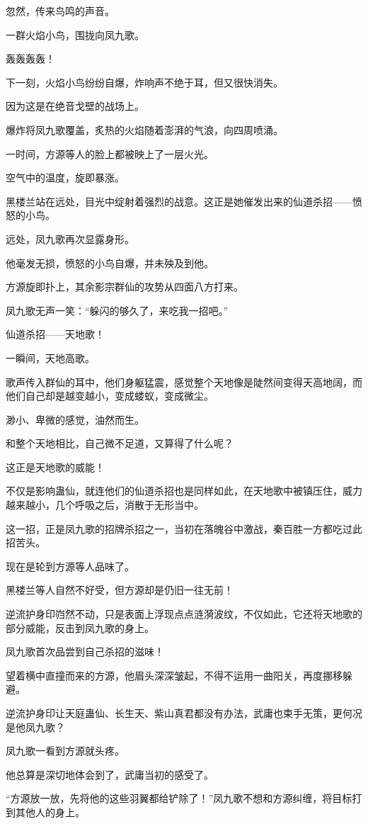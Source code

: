 \begin{this_body}
忽然，传来鸟鸣的声音。

一群火焰小鸟，围拢向凤九歌。

轰轰轰轰！

下一刻，火焰小鸟纷纷自爆，炸响声不绝于耳，但又很快消失。

因为这是在绝音戈壁的战场上。

爆炸将凤九歌覆盖，炙热的火焰随着澎湃的气浪，向四周喷涌。

一时间，方源等人的脸上都被映上了一层火光。

空气中的温度，旋即暴涨。

黑楼兰站在远处，目光中绽射着强烈的战意。这正是她催发出来的仙道杀招——愤怒的小鸟。

远处，凤九歌再次显露身形。

他毫发无损，愤怒的小鸟自爆，并未殃及到他。

方源旋即扑上，其余影宗群仙的攻势从四面八方打来。

凤九歌无声一笑：“躲闪的够久了，来吃我一招吧。”

仙道杀招——天地歌！

一瞬间，天地高歌。

歌声传入群仙的耳中，他们身躯猛震，感觉整个天地像是陡然间变得天高地阔，而他们自己却是越变越小，变成蝼蚁，变成微尘。

渺小、卑微的感觉，油然而生。

和整个天地相比，自己微不足道，又算得了什么呢？

这正是天地歌的威能！

不仅是影响蛊仙，就连他们的仙道杀招也是同样如此，在天地歌中被镇压住，威力越来越小，几个呼吸之后，消散于无形当中。

这一招，正是凤九歌的招牌杀招之一，当初在落魄谷中激战，秦百胜一方都吃过此招苦头。

现在是轮到方源等人品味了。

黑楼兰等人自然不好受，但方源却是仍旧一往无前！

逆流护身印岿然不动，只是表面上浮现点点涟漪波纹，不仅如此，它还将天地歌的部分威能，反击到凤九歌的身上。

凤九歌首次品尝到自己杀招的滋味！

望着横中直撞而来的方源，他眉头深深皱起，不得不运用一曲阳关，再度挪移躲避。

逆流护身印让天庭蛊仙、长生天、紫山真君都没有办法，武庸也束手无策，更何况是他凤九歌？

凤九歌一看到方源就头疼。

他总算是深切地体会到了，武庸当初的感受了。

“方源放一放，先将他的这些羽翼都给铲除了！”凤九歌不想和方源纠缠，将目标打到其他人的身上。

\end{this_body}

